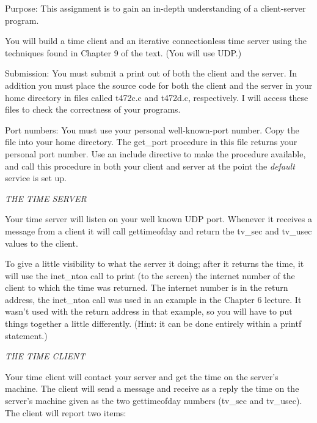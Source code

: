 

\parindent 0pt

Purpose: This assignment is to gain an in-depth understanding of
a client-server program.

You will build a time client and an iterative connectionless time server
using the techniques found in Chapter 9 of the text.
(You will use UDP.)

Submission: You must submit a print out of both the client and the server.
In addition you must place the source code for both the client and
the server in your home directory in files called {\ltt{}t472c.c}
and {\ltt{}t472d.c}, respectively. I will access these files to check
the correctness of your programs.

Port numbers: You must use your personal well-known-port number.
Copy the file\hfill{}
into your home directory. The {\ltt{}get_port} procedure in this file 
returns your personal port number.
Use an include directive to make the procedure available,
and call this procedure in both your client and server at the point
the {\it default} service is set up.

\noindent
{\it THE TIME SERVER}

Your time server will listen on your well known UDP port.
Whenever it receives a message from a client it will call {\ltt{}gettimeofday}
and return the {\ltt{}tv_sec} and {\ltt{}tv_usec} values to the client.

To give a little visibility to what the server it doing;
after it returns the time, it will use the {\ltt{}inet_ntoa} call to
print (to the screen) the internet number of the client to which the time
was returned.
The internet number is in the return address,
the {\ltt{}inet_ntoa} call was used in an example in the Chapter 6 lecture.
It wasn't used with the return address in that example, so you will
have to put things together a little differently.
(Hint: it can be done entirely within a {\ltt{}printf} statement.)

\noindent
{\it THE TIME CLIENT}

Your time client will contact your server and get the time on the server's 
machine.
The client will send a  message and receive as a reply the
time on the server's machine given as the two {\ltt{}gettimeofday} numbers
({\ltt{}tv_sec} and {\ltt{}tv_usec}).
The client will report two items:

